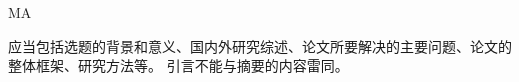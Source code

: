 

\begin{introduction}{MA}

应当包括选题的背景和意义、国内外研究综述、论文所要解决的主要问题、论文的整体框架、研究方法等。
引言不能与摘要的内容雷同。

\end{introduction}


